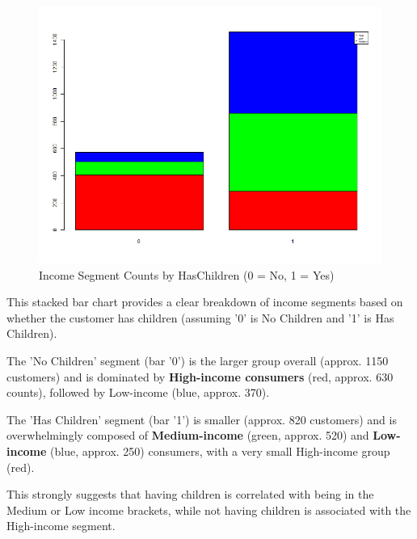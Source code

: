 \begin{figure}[H]
    \centering
    \includegraphics[width= 1\linewidth]{Imatges/stacked_barplot_counts_IncomeSegment_10_legend.png}
    \caption{Income Segment Counts by HasChildren (0 = No, 1 = Yes)}
    \label{fig:scree_plot_8} %
\end{figure}

This stacked bar chart provides a clear breakdown of income segments based on whether the customer has children (assuming '0' is No Children and '1' is Has Children).

The 'No Children' segment (bar '0') is the larger group overall (approx. 1150 customers) and is dominated by \textbf{High-income consumers} (red, approx. 630 counts), followed by Low-income (blue, approx. 370).

The 'Has Children' segment (bar '1') is smaller (approx. 820 customers) and is overwhelmingly composed of \textbf{Medium-income} (green, approx. 520) and \textbf{Low-income} (blue, approx. 250) consumers, with a very small High-income group (red).

This strongly suggests that having children is correlated with being in the Medium or Low income brackets, while not having children is associated with the High-income segment.

